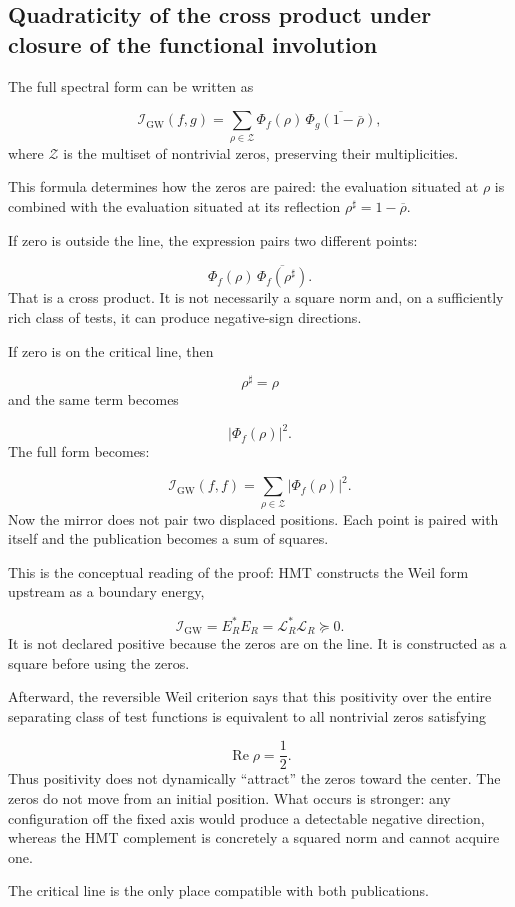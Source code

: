 \subsection{Quadraticity of the cross product under closure of the functional involution}
The full spectral form can be written as\par
\[
\mathscr I_{\mathrm{GW}}(f,g)
=
\sum_{\rho\in\mathscr Z}
\Phi_f(\rho)\,
\overline{\Phi_g(1-\overline\rho)},
\]
where \(\mathscr Z\) is the multiset of nontrivial zeros, preserving their multiplicities.\par
This formula determines how the zeros are paired: the evaluation situated at \(\rho\) is combined with the evaluation situated at its reflection \(\rho^\sharp=1-\overline\rho\).\par
If zero is outside the line, the expression pairs two different points:\par
\[
\Phi_f(\rho)\,
\overline{\Phi_f(\rho^\sharp)}.
\]
That is a cross product. It is not necessarily a square norm and, on a sufficiently rich class of tests, it can produce negative-sign directions.\par
If zero is on the critical line, then\par
\[
\rho^\sharp=\rho
\]
and the same term becomes\par
\[
|\Phi_f(\rho)|^2.
\]
The full form becomes:\par
\[
\mathscr I_{\mathrm{GW}}(f,f)
=
\sum_{\rho\in\mathscr Z}
|\Phi_f(\rho)|^2.
\]
Now the mirror does not pair two displaced positions. Each point is paired with itself and the publication becomes a sum of squares.\par
This is the conceptual reading of the proof: HMT constructs the Weil form upstream as a boundary energy,\par
\[
\mathscr I_{\mathrm{GW}}
=
E_R^*E_R
=
\mathscr L_R^*\mathscr L_R
\succeq0.
\]
It is not declared positive because the zeros are on the line. It is constructed as a square before using the zeros.\par
Afterward, the reversible Weil criterion says that this positivity over the entire separating class of test functions is equivalent to all nontrivial zeros satisfying\par
\[
\operatorname{Re}\rho=\frac12.
\]
Thus positivity does not dynamically “attract” the zeros toward the center. The zeros do not move from an initial position. What occurs is stronger: any configuration off the fixed axis would produce a detectable negative direction, whereas the HMT complement is concretely a squared norm and cannot acquire one.\par
The critical line is the only place compatible with both publications.\par
{}
